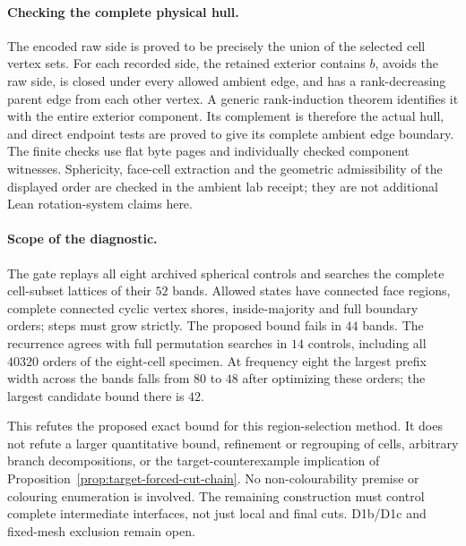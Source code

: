 \paragraph{Checking the complete physical hull.}
The encoded raw side is proved to be precisely the union of the selected
cell vertex sets. For each recorded side, the retained exterior contains
$b$, avoids the raw side, is closed under every allowed ambient edge, and
has a rank-decreasing parent edge from each other vertex. A generic
rank-induction theorem identifies it with the entire exterior component.
Its complement is therefore the actual hull, and direct endpoint tests
are proved to give its complete ambient edge boundary.
The finite checks use flat byte pages and individually checked component
witnesses. Sphericity, face-cell extraction and the geometric admissibility
of the displayed order are checked in the ambient lab receipt; they are
not additional Lean rotation-system claims here.

\paragraph{Scope of the diagnostic.}
The gate replays all eight archived spherical controls and searches the
complete cell-subset lattices of their $52$ bands. Allowed states have
connected face regions, complete connected cyclic vertex shores,
inside-majority and full boundary orders; steps must grow strictly.
The proposed bound fails in $44$ bands. The recurrence agrees with full
permutation searches in $14$ controls, including all $40320$ orders of
the eight-cell specimen. At frequency eight the largest prefix width
across the bands falls from $80$ to $48$ after optimizing these orders;
the largest candidate bound there is $42$.

This refutes the proposed exact bound for this region-selection method.
It does not refute a larger quantitative bound, refinement or regrouping
of cells, arbitrary branch decompositions, or the target-counterexample
implication of Proposition~\ref{prop:target-forced-cut-chain}. No
non-colourability premise or colouring enumeration is involved. The
remaining construction must control complete intermediate interfaces,
not just local and final cuts. D1b/D1c and fixed-mesh exclusion remain
open.

